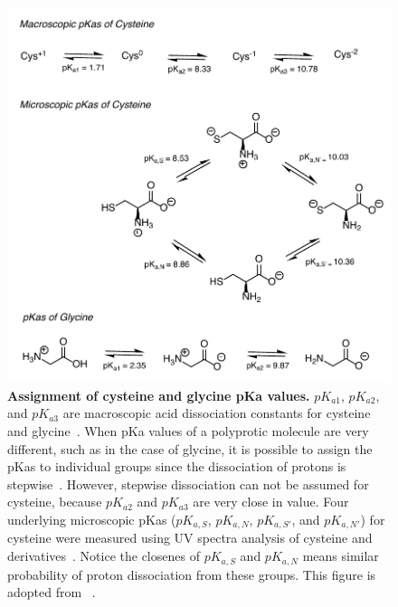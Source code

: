\documentclass[9pt,lineno]{elife}
\begin{document}
\begin{figure}
\begin{center}
\includegraphics[width=0.65\linewidth]{figures/cysteine_vs_glycine_fig.pdf}
\caption{{\bf Assignment of cysteine and glycine pKa values.}  $pK_{a1}$, $pK_{a2}$, and $pK_{a3}$ are macroscopic acid dissociation constants for cysteine and glycine~\citep{sober_handbook_1970}. When pKa values of a polyprotic molecule are very different, such as in the case of glycine, it is possible to assign the pKas to individual groups since the dissociation of protons is stepwise~\citep{bodner_assigning_1986}. However, stepwise dissociation can not be assumed for cysteine, because $pK_{a2}$ and $pK_{a3}$ are very close in value. Four underlying microscopic pKas ($pK_{a,S}$, $pK_{a,N}$, $pK_{a,S'}$, and $pK_{a,N'}$) for cysteine were measured using UV spectra analysis of cysteine and derivatives~\citep{doi:10.1021/ja01627a030}. Notice the closenes of $pK_{a,S}$ and $pK_{a,N}$ means similar probability of proton dissociation from these groups. This figure is adopted from ~\citep{bodner_assigning_1986}. 
}
\label{fig:cys_vs_gly}
\end{center}
\end{figure}
\end{document}
